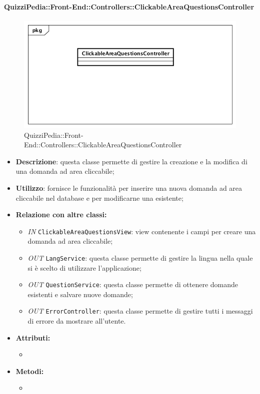 \paragraph{QuizziPedia::Front-End::Controllers::ClickableAreaQuestionsController}
\begin{figure}
	\centering
	\includegraphics[scale=0.45]{UML/Classi/Front-End/QuizziPedia_Front-end_Controller_ClickableAreaQuestionsController.png}
	\caption{QuizziPedia::Front-End::Controllers::ClickableAreaQuestionsController}
\end{figure}
\begin{itemize}
	\item \textbf{Descrizione}: questa classe permette di gestire la creazione e la modifica di una domanda ad area cliccabile;
	\item \textbf{Utilizzo}: fornisce le funzionalità per inserire una nuova domanda ad area cliccabile nel database e per modificarne una esistente;
	\item \textbf{Relazione con altre classi:}
	\begin{itemize}
		\item \textit{IN} \texttt{ClickableAreaQuestionsView}: view contenente i campi per creare una domanda ad area cliccabile; 
		\item \textit{OUT} \texttt{LangService}: questa classe permette di gestire la lingua nella quale si è scelto di utilizzare l'applicazione;
		\item \textit{OUT} \texttt{QuestionService}: questa classe permette di ottenere domande esistenti e salvare nuove domande;
		\item \textit{OUT} \texttt{ErrorController}: questa classe permette di gestire tutti i messaggi di errore da mostrare all'utente.
	\end{itemize}
	\item \textbf{Attributi:}
	\begin{itemize}
		\item 
	\end{itemize}
	\item \textbf{Metodi:}
	\begin{itemize}
		\item 
	\end{itemize}
\end{itemize}

